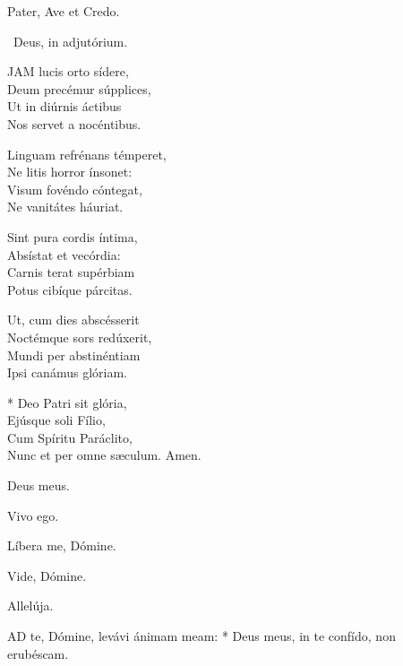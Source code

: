 
Pater, Ave et Credo.

\V\ Deus, in adjutórium.


\lettrine[lines=2]{J}{AM} lucis orto sídere,\\
Deum precémur súpplices,\\
Ut in diúrnis áctibus\\
Nos servet a nocéntibus.

Linguam refrénans témperet,\\
Ne litis horror ínsonet:\\
Visum fovéndo cóntegat,\\
Ne vanitátes háuriat.

Sint pura cordis íntima,\\
Absístat et vecórdia:\\
Carnis terat supérbiam\\
Potus cibíque párcitas.

Ut, cum dies abscésserit\\
Noctémque sors redúxerit,\\
Mundi per abstinéntiam\\
Ipsi canámus glóriam.

* Deo Patri sit glória,\\
Ejúsque soli Fílio,\\
Cum Spíritu Paráclito,\\
Nunc et per omne sæculum. Amen.

  Deus meus.



 Vivo ego.


 Líbera me, Dómine.


 Vide, Dómine.


 Allelúja.


\lettrine[lines=2]{A}{D} te, Dómine, levávi ánimam meam: * Deus meus, in te confído, non erubéscam.

